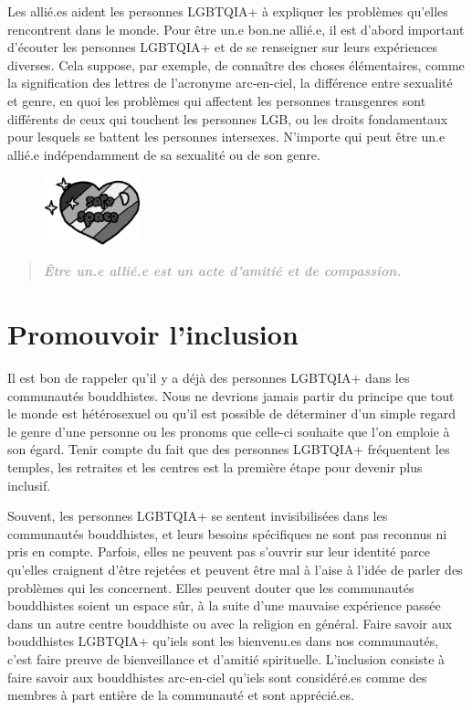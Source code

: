 \documentclass[12pt,openany]{book}
\begin{document}
Les allié.es aident les personnes \mbox{LGBTQIA+} à expliquer les problèmes qu’elles rencontrent dans le monde. Pour être un.e bon.ne allié.e, il est d’abord important d’écouter les personnes \mbox{LGBTQIA+} et de se renseigner sur leurs expériences diverses. Cela suppose, par exemple, de connaître des choses élémentaires, comme la signification des lettres de l’acronyme arc-en-ciel, la différence entre sexualité et genre, en quoi les problèmes qui affectent les personnes transgenres sont différents de ceux qui touchent les personnes LGB, ou les droits fondamentaux pour lesquels se battent les personnes intersexes. N’importe qui peut être un.e allié.e indépendamment de sa sexualité ou de son genre.
\begin{figure}
    \centering
    \includegraphics[width=0.25\textwidth]{12bw.png}
\end{figure}

\begin{quote}
\textit{\large \textbf{\textcolor{darkgray}{Être un.e allié.e est un acte d’amitié et de compassion.}}}
\end{quote}

\section*{Promouvoir l’inclusion}

\noindent Il est bon de rappeler qu’il y a déjà des personnes \mbox{LGBTQIA+} dans les communautés bouddhistes. Nous ne devrions jamais partir du principe que tout le monde est hétérosexuel ou qu’il est possible de déterminer d’un simple regard le genre d’une personne ou les pronoms que celle-ci souhaite que l’on emploie à son égard. Tenir compte du fait que des personnes \mbox{LGBTQIA+} fréquentent les temples, les retraites et les centres est la première étape pour devenir plus inclusif.

Souvent, les personnes \mbox{LGBTQIA+} se sentent invisibilisées dans les communautés bouddhistes, et leurs besoins spécifiques ne sont pas reconnus ni pris en compte. Parfois, elles ne peuvent pas s’ouvrir sur leur identité parce qu’elles craignent d’être rejetées et peuvent être mal à l’aise à l’idée de parler des problèmes qui les concernent. Elles peuvent douter que les communautés bouddhistes soient un espace sûr, à la suite d’une mauvaise expérience passée dans un autre centre bouddhiste ou avec la religion en général. Faire savoir aux bouddhistes \mbox{LGBTQIA+} qu’iels sont les bienvenu.es dans nos communautés, c’est faire preuve de bienveillance et d’amitié spirituelle. L’inclusion consiste à faire savoir aux bouddhistes arc-en-ciel qu’iels sont considéré.es comme des membres à part entière de la communauté et sont apprécié.es.
\end{document}
